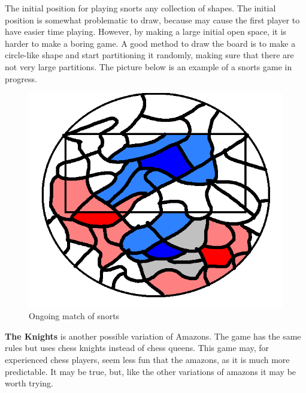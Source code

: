 The initial position for playing snorts any collection of shapes. The initial position is somewhat problematic to draw, because may cause the first player to have easier time playing. However, by making a large initial open space, it is harder to make a boring game. A good method to draw the board is to make a circle-like shape and start partitioning it randomly, making sure that there are not very large partitions. The picture below is an example of a snorts game in progress.

\begin{figure} [H]
	\begin{center}
\includegraphics[scale=0.6]{sections/examples/snorts.png}
	\end{center}
\caption{Ongoing match of snorts}
\end{figure}

\textbf{The Knights} is another possible variation of Amazons. The game has the same rules but uses chess knights instead of chess queens. This game may, for experienced chess players, seem less fun that the amazons, as it is much more predictable. It may be true, but, like the other variations of amazons it may be worth trying.















